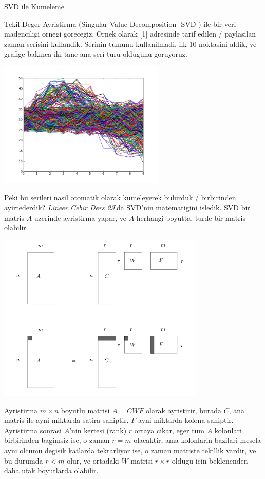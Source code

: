 \documentclass[12pt,fleqn]{article}\usepackage{../common}
\begin{document}
SVD ile Kumeleme

Tekil Deger Ayristirma (Singular Value Decomposition -SVD-) ile bir veri
madenciligi ornegi gorecegiz. Ornek olarak [1] adresinde tarif edilen /
paylasilan zaman serisini kullandik. Serinin tumunu kullanilmadi, ilk 10
noktasini aldik, ve grafige bakinca iki tane ana seri turu oldugunu
goruyoruz.

\includegraphics[height=6cm]{data.png}



Peki bu serileri nasil otomatik olarak kumeleyerek bulurduk / birbirinden
ayirtederdik?  {\em Lineer Cebir Ders 29}'da SVD'nin matematigini
isledik. SVD bir matris $A$ uzerinde ayristirma yapar, ve $A$ herhangi
boyutta, turde bir matris olabilir.

\includegraphics[height=8cm]{svd1.png}

Ayristirma $m \times n$ boyutlu matrisi $A=CWF$ olarak ayristirir, burada
$C$, ana matris ile ayni miktarda satira sahiptir, $F$ ayni miktarda kolona
sahiptir. Ayristirma sonrasi $A$'nin kertesi (rank) $r$ ortaya cikar, eger
tum $A$ kolonlari birbirinden bagimsiz ise, o zaman $r=m$ olacaktir, ama
kolonlarin bazilari mesela ayni olcumu degisik katlarda tekrarliyor ise, o
zaman matriste tekillik vardir, ve bu durumda $r < m$ olur, ve ortadaki $W$
matrisi $r \times r$ oldugu icin beklenenden daha ufak boyutlarda
olabilir. 
\end{document}
